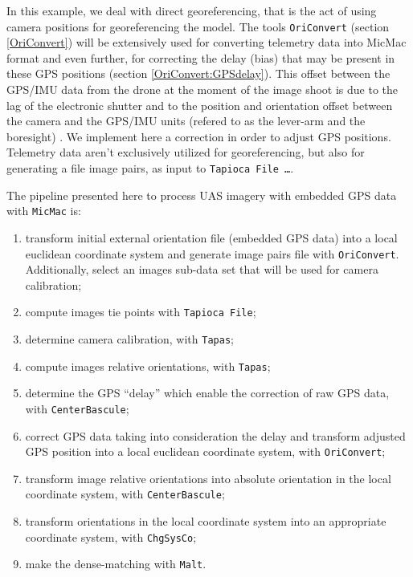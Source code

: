 In this example, we deal with direct georeferencing, that is the act of using camera positions for georeferencing the model. The tools {\tt OriConvert} (section \ref{OriConvert}) will be extensively used for converting telemetry data into MicMac format and even further, for correcting the delay (bias) that may be present in these GPS positions (section \ref{OriConvert:GPSdelay}). This offset between the GPS/IMU data from the drone at the moment of the image shoot is due to the lag of the electronic shutter and to the position and orientation offset between the camera and the GPS/IMU units (refered to as the lever-arm and the boresight) . We implement here a correction  in order to adjust GPS positions. Telemetry data aren't exclusively utilized for georeferencing, but also for generating a file image pairs, as input to {\tt Tapioca File \dots }.


\vspace{\baselineskip}
The pipeline presented here to process UAS imagery with embedded GPS data with {\tt MicMac} is:
\begin{enumerate}
\item transform initial external orientation file (embedded GPS data) into a local euclidean coordinate system and generate image pairs file with {\tt OriConvert}. Additionally, select an images sub-data set that will be used for camera calibration;
\item compute images tie points with {\tt Tapioca File};
\item determine camera calibration, with {\tt Tapas};
\item compute images relative orientations, with {\tt Tapas};
\item determine the GPS ``delay'' which enable the correction of raw GPS data, with {\tt CenterBascule};
\item correct GPS data taking into consideration the delay and transform adjusted GPS position into a local euclidean coordinate system, with {\tt OriConvert};
\item transform image relative orientations into absolute orientation in the local coordinate system, with {\tt CenterBascule};
\item transform orientations in the local coordinate system into an appropriate coordinate system, with {\tt ChgSysCo};
\item make the dense-matching with {\tt Malt}.
\end{enumerate}
\vspace{\baselineskip}

